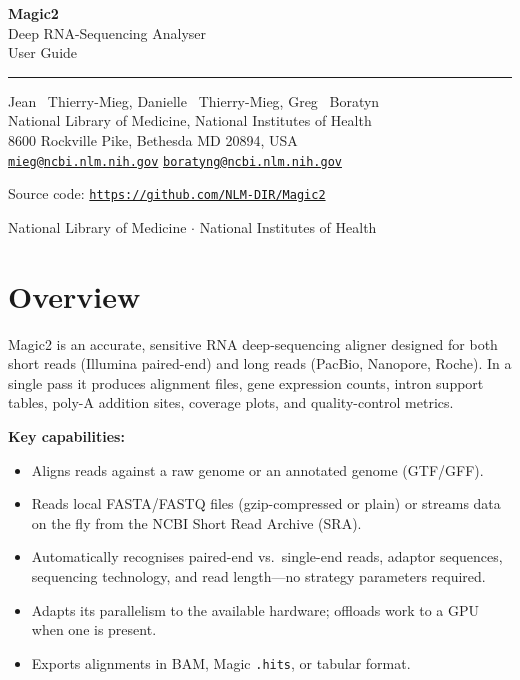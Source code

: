 \documentclass[11pt]{article}
\newcommand{\code}[1]{\texttt{#1}}
\begin{document}
\begin{titlepage}
\vspace*{20mm}
{\Huge \textbf{Magic2}}\\[4mm]
{\Large Deep RNA-Sequencing Analyser}\\[2mm]
{\large User Guide}
\vspace{8mm}
\hrule
\vspace{8mm}
{\large Jean ~Thierry-Mieg, Danielle ~Thierry-Mieg, Greg ~Boratyn}\\[2mm]
National Library of Medicine, National Institutes of Health\\
8600 Rockville Pike, Bethesda MD 20894, USA\\[2mm]
\href{mailto:mieg@ncbi.nlm.nih.gov}{\texttt{mieg@ncbi.nlm.nih.gov}}
\href{mailto:boratyng@ncbi.nlm.nih.gov}{\texttt{boratyng@ncbi.nlm.nih.gov}}
\vspace{8mm}

\noindent Source code: \href{https://github.com/NLM-DIR/Magic2}{\texttt{https://github.com/NLM-DIR/Magic2}}

\vfill
\small National Library of Medicine $\cdot$ National Institutes of Health
\end{titlepage}

\newpage
\tableofcontents
\newpage

\section{Overview}

Magic2 is an accurate, sensitive RNA deep-sequencing aligner designed for
both short reads (Illumina paired-end) and long reads (PacBio, Nanopore,
Roche).  In a single pass it produces alignment files, gene expression
counts, intron support tables, poly-A addition sites, coverage plots, and
quality-control metrics.

\textbf{Key capabilities:}
\begin{itemize}
  \item Aligns reads against a raw genome or an annotated genome (GTF/GFF).
  \item Reads local FASTA/FASTQ files (gzip-compressed or plain) or streams
        data on the fly from the NCBI Short Read Archive (SRA).
  \item Automatically recognises paired-end vs.\ single-end reads, adaptor
        sequences, sequencing technology, and read length---no strategy
        parameters required.
  \item Adapts its parallelism to the available hardware; offloads work to
        a GPU when one is present.
  \item Exports alignments in BAM, Magic \code{.hits}, or tabular format.
\end{itemize}
\end{document}
